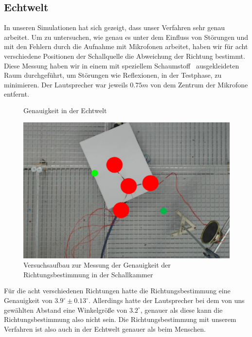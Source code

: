 \subsection{Echtwelt}
In unseren Simulationen hat sich gezeigt, dass unser Verfahren sehr genau arbeitet. Um zu untersuchen, wie genau es unter dem Einfluss von Störungen und mit den Fehlern durch die Aufnahme mit Mikrofonen arbeitet, haben wir für acht verschiedene Positionen der Schallquelle die Abweichung der Richtung bestimmt. Diese Messung haben wir in einem mit speziellem Schaumstoff~\cite{BASOTECT} ausgekleideten Raum durchgeführt, um Störungen wie Reflexionen, in der Testphase, zu minimieren. Der Lautsprecher war jeweils $0.75m$ von dem Zentrum der Mikrofone entfernt.
\begin{figure}[H]
  \centering
  \resizebox{!}{0.55\textwidth}{}
  \caption{Genauigkeit in der Echtwelt}
  \label{fig:real}
\end{figure}
\begin{figure}[H]
  \centering
  \includegraphics[width=.5\textwidth]{img/pos_1}
  \caption{Versuchsaufbau zur Messung der Genauigkeit der Richtungsbestimmung in der Schallkammer}
  \label{fig:real_reral}
\end{figure}
Für die acht verschiedenen Richtungen hatte die Richtungsbestimmung eine Genauigkeit von $3.9^\circ \pm 0.13^\circ$. Allerdings hatte der Lautsprecher bei dem von uns gewählten Abstand eine Winkelgröße von $3.2^\circ$, genauer als diese kann die Richtungsbestimmung also nicht sein. Die Richtungsbestimmung mit unserem Verfahren ist also auch in der Echtwelt genauer als beim Menschen.

